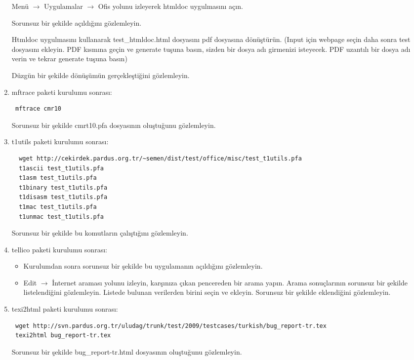 \documentclass[a4paper,10pt]{article}
\begin{document}
\begin{enumerate}
Menü $\rightarrow$ Uygulamalar $\rightarrow$ Ofis yolunu izleyerek htmldoc uygulmasını açın.

Sorunsuz bir şekilde açıldığını gözlemleyin.

Htmldoc uygulmasını kullanarak test\_htmldoc.html dosyasını pdf dosyasına dönüştürün. (Input için webpage seçin daha sonra test dosyasını ekleyin. PDF kısmına geçin ve generate tuşuna basın, sizden bir dosya adı girmenizi isteyecek. PDF uzantılı bir dosya adı verin ve tekrar generate tuşuna basın)
 
Düzgün bir şekilde dönüşümün gerçekleştiğini gözlemleyin.
\item mftrace paketi kurulumu sonrası:
\begin{verbatim}
 mftrace cmr10
\end{verbatim}
Sorunsuz bir şekilde cmrt10.pfa dosyasının oluştuğunu gözlemleyin.
\item t1utils paketi kurulumu sonrası:
\begin{verbatim}
  wget http://cekirdek.pardus.org.tr/~semen/dist/test/office/misc/test_t1utils.pfa
  t1ascii test_t1utils.pfa
  t1asm test_t1utils.pfa
  t1binary test_t1utils.pfa
  t1disasm test_t1utils.pfa
  t1mac test_t1utils.pfa
  t1unmac test_t1utils.pfa
\end{verbatim}

Sorunsuz bir şekilde bu komutların çalıştığını gözlemleyin. 
\item tellico paketi kurulumu sonrası:

\begin{itemize}
 \item Kurulumdan sonra sorunsuz bir şekilde bu uygulamanın açıldığını gözlemleyin.
 \item Edit $\rightarrow$ İnternet araması yolunu izleyin, karşınıza çıkan pencereden bir arama yapın. Arama sonuçlarının sorunsuz bir şekilde listelendiğini gözlemleyin. Listede bulunan verilerden birini seçin ve ekleyin. Sorunsuz bir şekilde eklendiğini gözlemleyin.
\end{itemize}

\item texi2html paketi kurulumu sonrası:
\begin{verbatim}
 wget http://svn.pardus.org.tr/uludag/trunk/test/2009/testcases/turkish/bug_report-tr.tex
 texi2html bug_report-tr.tex
\end{verbatim}

Sorunsuz bir şekilde bug\_report-tr.html dosyasının oluştuğunu gözlemleyin.


\end{enumerate}
\end{document}

